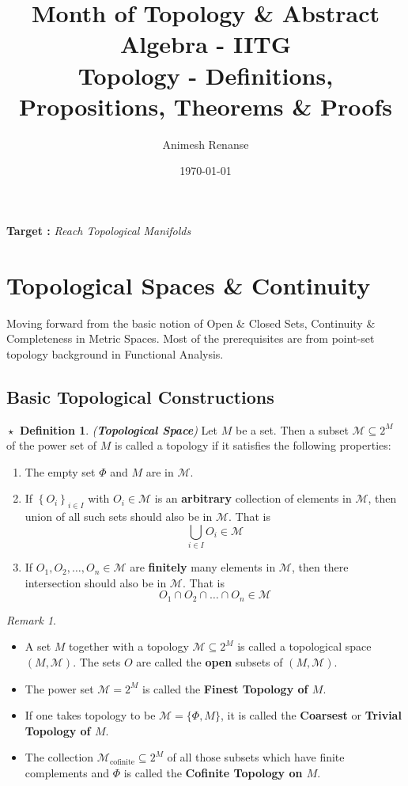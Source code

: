 \documentclass{article}
\title{Month of Topology \& Abstract Algebra - IITG\\
	 \large Topology - Definitions, Propositions, Theorems \& Proofs}
\author{Animesh Renanse}
\date{\today}
\theoremstyle{definition}
\newtheorem{definition}{$\boxed{\star}$ Definition}
\newcommand{\tit}[1]{\textit{#1}}
\theoremstyle{remark}
\newtheorem*{remark}{Remark}
\theoremstyle{definition}
\theoremstyle{definition}
\newcommand{\topo}[1]{\mathcal{#1}}
\begin{document}
	\maketitle
\textbf{Target : } \textit{Reach Topological Manifolds}
\section{Topological Spaces \& Continuity}
Moving forward from the basic notion of Open \& Closed Sets, Continuity \& Completeness in Metric Spaces. Most of the prerequisites are from point-set topology background in Functional Analysis.
\subsection{Basic Topological Constructions}
\hrulefill
\begin{definition}
	\tit{(\textbf{Topological Space})} Let $ M $ be a set. Then a subset $ \mathcal{M} \subseteq 2^M$ of the power set of $ M $ is called a topology if it satisfies the following properties:
	\begin{enumerate}
		\item{The empty set $ \Phi $ and $ M $ are in $ \mathcal{M} $.}
		\item{If $ \left\{ O_i \right\}_{i\in I}$ with $ O_i \in \mathcal{M} $ is an \textbf{arbitrary} collection of elements in $ \mathcal{M} $, then union of all such sets should also be in $ \mathcal{M} $. That is 
			\[ \bigcup_{i\in I}O_i \in \mathcal{M}\]}
		\item{If $ O_1, O_2, \dots, O_n \in \mathcal{M} $ are \textbf{finitely} many elements in $ \mathcal{M} $, then there intersection should also be in $ \mathcal{M} $. That is 
	\[O_1\cap O_2 \cap \dots \cap O_n \in \mathcal{M}\]	
	}
	\end{enumerate}
\end{definition}
\begin{remark}
	\begin{itemize}
		\item{A set $ M $ together with a topology $ \topo{M} \subseteq 2^M$ is called a topological space $ (M,\topo{M}) $. The sets $ O $ are called the \textbf{open} subsets of $ (M,\topo{M}) $.}
		\item{The power set $ \mathcal{M} = 2^M $ is called the \textbf{Finest Topology of $ M $}.}
		\item{If one takes topology to be $ \mathcal{M} = \{\Phi, M\} $, it is called the \textbf{Coarsest} or \textbf{Trivial Topology of $ M $}.}
		\item{The collection $ \mathcal{M}_{\text{cofinite}} \subseteq 2^M $ of all those subsets which have finite complements and $ \Phi $ is called the \textbf{Cofinite Topology on $ M $}.}
	\end{itemize}
\end{remark}
\end{document}
